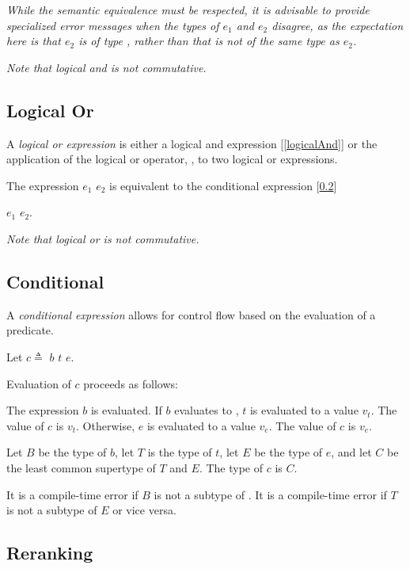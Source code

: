 \documentclass{article}
\begin{document}
{{\em While the semantic equivalence must be respected, it is advisable to provide specialized error messages when the types of $e_1$ and $e_2$ disagree,  as the expectation here is that $e_2$ is of type \BOOL{}, rather than that \FALSE{} is not of the same type as $e_2$.
}

{\em
Note that logical and is not commutative.
}

\subsection{Logical Or}
\label{logicalOr}

A {\em logical or expression} is either a logical and expression [\ref{logicalAnd}] or the application of the logical or operator, \AND{}, to two logical or expressions.

\OrExpression{}

The expression $e_1$ \OR{} $e_2$ is equivalent to the conditional expression [\ref{conditional}] 

\IF{} $e_1$ \THEN{} \TRUE{} \ELSE{} $e_2$.

{\em
Note that logical or is not commutative.
}


\subsection{Conditional}
\label{conditional}

A {\em conditional expression} allows for control flow based on the evaluation of a predicate.

\ConditionalExpression{}

Let $c \triangleq $ \IF{} $b$ \THEN{} $t$ \ELSE{} $e$.

Evaluation of $c$ proceeds as follows:

The expression $b$ is evaluated. 
If $b$ evaluates to \TRUE{}, $t$ is evaluated to a value $v_t$. The value of $c$ is $v_t$. Otherwise, $e$ is evaluated to a value $v_e$. The value of $c$ is $v_e$.

Let $B$ be the type of $b$, let $T$ is the type of $t$, let $E$ be the type of $e$, and let $C$ be the least common supertype of $T$ and $E$. The type of $c$ is $C$. 

It is a compile-time error if $B$ is not a subtype of \BOOL{}. It is a compile-time error if $T$ is not a subtype of $E$ or vice versa. 

\subsection{Reranking}
\label{reranking}

}
\end{document}
